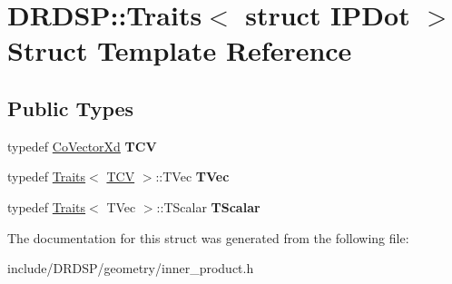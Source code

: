 \hypertarget{struct_d_r_d_s_p_1_1_traits_3_01struct_01_i_p_dot_01_4}{\section{D\-R\-D\-S\-P\-:\-:Traits$<$ struct I\-P\-Dot $>$ Struct Template Reference}
\label{struct_d_r_d_s_p_1_1_traits_3_01struct_01_i_p_dot_01_4}
}
\subsection*{Public Types}
\begin{DoxyCompactItemize}
\item 
\hypertarget{struct_d_r_d_s_p_1_1_traits_3_01struct_01_i_p_dot_01_4_aa9077bf7b2e5fd9130525e4442082f49}{typedef \hyperlink{struct_d_r_d_s_p_1_1_co_vector_xd}{Co\-Vector\-Xd} {\bfseries T\-C\-V}}\label{struct_d_r_d_s_p_1_1_traits_3_01struct_01_i_p_dot_01_4_aa9077bf7b2e5fd9130525e4442082f49}

\item 
\hypertarget{struct_d_r_d_s_p_1_1_traits_3_01struct_01_i_p_dot_01_4_a2c2052b4655b41dd1ad57407be283524}{typedef \hyperlink{struct_d_r_d_s_p_1_1_traits}{Traits}$<$ \hyperlink{struct_d_r_d_s_p_1_1_co_vector_xd}{T\-C\-V} $>$\-::T\-Vec {\bfseries T\-Vec}}\label{struct_d_r_d_s_p_1_1_traits_3_01struct_01_i_p_dot_01_4_a2c2052b4655b41dd1ad57407be283524}

\item 
\hypertarget{struct_d_r_d_s_p_1_1_traits_3_01struct_01_i_p_dot_01_4_a4079bbff8395a69eefb9352209db8227}{typedef \hyperlink{struct_d_r_d_s_p_1_1_traits}{Traits}$<$ T\-Vec $>$\-::T\-Scalar {\bfseries T\-Scalar}}\label{struct_d_r_d_s_p_1_1_traits_3_01struct_01_i_p_dot_01_4_a4079bbff8395a69eefb9352209db8227}

\end{DoxyCompactItemize}


The documentation for this struct was generated from the following file\-:\begin{DoxyCompactItemize}
\item 
include/\-D\-R\-D\-S\-P/geometry/inner\-\_\-product.\-h\end{DoxyCompactItemize}
